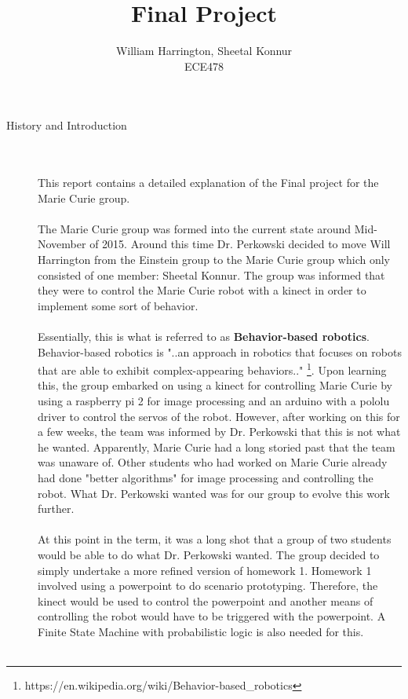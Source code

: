 \documentclass[12pt]{article}
\begin{document}
\title{Final Project}%
\author{William Harrington, Sheetal Konnur\\ %
ECE478} %
\date{}
 
\maketitle
\small
\begin{description}
	\item[History and Introduction] \hfill \\ \\
		This report contains a detailed explanation of the Final project for the Marie Curie group. \\ \\
		The Marie Curie group was formed into the current state around Mid-November of 2015. Around this time Dr. Perkowski decided to move Will Harrington from the Einstein group to the Marie Curie group which only consisted of one member: Sheetal Konnur. The group was informed that they were to control the Marie Curie robot with a kinect in order to implement some sort of behavior.\\ \\
		Essentially, this is what is referred to as \textbf{Behavior-based robotics}. Behavior-based robotics is "..an approach in robotics that focuses on robots that are able to exhibit complex-appearing behaviors.." \footnote{https://en.wikipedia.org/wiki/Behavior-based\_robotics}. Upon learning this, the group embarked on using a kinect for controlling Marie Curie by using a raspberry pi 2 for image processing and an arduino with a pololu driver to control the servos of the robot. However, after working on this for a few weeks, the team was informed by Dr. Perkowski that this is not what he wanted. Apparently, Marie Curie had a long storied past that the team was unaware of. Other students who had worked on Marie Curie already had done "better algorithms" for image processing and controlling the robot. What Dr. Perkowski wanted was for our group to evolve this work further. \\ \\
		At this point in the term, it was a long shot that a group of two students would be able to do what Dr. Perkowski wanted. The group decided to simply undertake a more refined version of homework 1. Homework 1 involved using a powerpoint to do scenario prototyping. Therefore, the kinect would be used to control the powerpoint and another means of controlling the robot would have to be triggered with the powerpoint. A Finite State Machine with probabilistic logic is also needed for this. \\ \\

\end{description}
\end{document}
